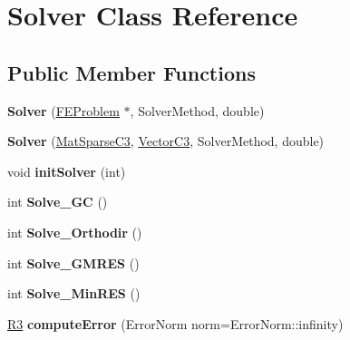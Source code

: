 \hypertarget{class_solver}{}\section{Solver Class Reference}
\label{class_solver}
\subsection*{Public Member Functions}
\begin{DoxyCompactItemize}
\item 
{\bfseries Solver} (\hyperlink{class_f_e_problem}{F\+E\+Problem} $\ast$, Solver\+Method, double)\hypertarget{class_solver_aa2cf55d1dd4bc766e158333676d02907}{}\label{class_solver_aa2cf55d1dd4bc766e158333676d02907}

\item 
{\bfseries Solver} (\hyperlink{class_mat_sparse_c3}{Mat\+Sparse\+C3}, \hyperlink{class_vector_c3}{Vector\+C3}, Solver\+Method, double)\hypertarget{class_solver_a17df28f12239414a6ba9c69897d6495c}{}\label{class_solver_a17df28f12239414a6ba9c69897d6495c}

\item 
void {\bfseries init\+Solver} (int)\hypertarget{class_solver_a92e48ba76fe9154ab8270501488dd04d}{}\label{class_solver_a92e48ba76fe9154ab8270501488dd04d}

\item 
int {\bfseries Solve\+\_\+\+GC} ()\hypertarget{class_solver_a52310e223b4250a300690c703b74cc61}{}\label{class_solver_a52310e223b4250a300690c703b74cc61}

\item 
int {\bfseries Solve\+\_\+\+Orthodir} ()\hypertarget{class_solver_a0ae365806d42d59d6de9cfb6a2f5de24}{}\label{class_solver_a0ae365806d42d59d6de9cfb6a2f5de24}

\item 
int {\bfseries Solve\+\_\+\+G\+M\+R\+ES} ()\hypertarget{class_solver_a5ba090a92a672380ff0cb0902f138971}{}\label{class_solver_a5ba090a92a672380ff0cb0902f138971}

\item 
int {\bfseries Solve\+\_\+\+Min\+R\+ES} ()\hypertarget{class_solver_aa00ad25fcf01bdc9b10a94cead1ac433}{}\label{class_solver_aa00ad25fcf01bdc9b10a94cead1ac433}

\item 
\hyperlink{class_r3}{R3} {\bfseries compute\+Error} (Error\+Norm norm=Error\+Norm\+::infinity)\hypertarget{class_solver_a161542bed520dd70b7eaae65bff7c83f}{}\label{class_solver_a161542bed520dd70b7eaae65bff7c83f}


\end{DoxyCompactItemize}
